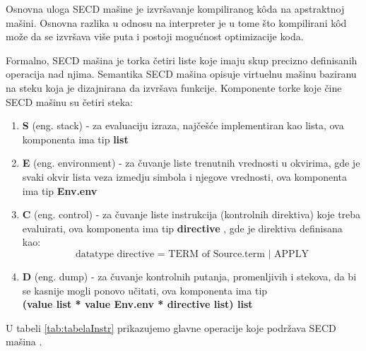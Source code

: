 Osnovna uloga SECD mašine je izvršavanje kompiliranog k\^ oda na apstraktnoj mašini. Osnovna razlika u odnosu na interpreter je u tome što kompilirani k\^ od može da se izvršava više puta i postoji mogućnost optimizacije koda. 

Formalno, SECD mašina je torka četiri liste koje imaju skup precizno definisanih operacija nad njima. Semantika SECD mašina opisuje virtuelnu mašinu baziranu na steku koja je dizajnirana da izvršava funkcije. Komponente torke koje čine SECD mašinu su četiri steka:
\begin{enumerate}
\item {\bf S} (eng. stack) - za evaluaciju izraza, najčešće implementiran kao lista, ova komponenta ima tip {\bf list}  
\item {\bf E} (eng. environment) - za čuvanje liste trenutnih vrednosti u okvirima, gde je svaki okvir lista veza izmedju simbola i njegove vrednosti, ova komponenta ima tip {\bf Env.env}  
\item {\bf C} (eng. control) - za čuvanje liste instrukcija (kontrolnih direktiva) koje treba evaluirati, ova komponenta ima tip {\bf directive} , gde je direktiva definisana kao: $$ \text{datatype directive = TERM of Source.term | APPLY} $$
\item {\bf D} (eng. dump) - za čuvanje kontrolnih putanja, promenljivih i stekova, da bi se kasnije mogli ponovo učitati, ova komponenta ima tip\\ {\bf(value list * value Env.env * directive list) list}
\end{enumerate}

\noindent U tabeli \ref{tab:tabelaInstr} prikazujemo glavne operacije koje podržava SECD mašina \cite{introduction-fp-systems}. \\

